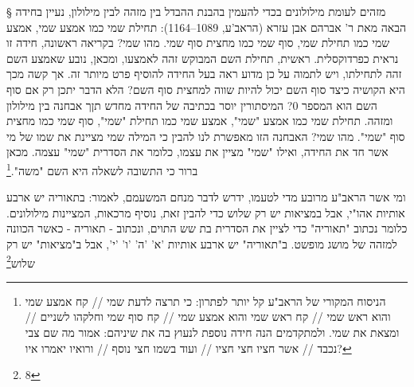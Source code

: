       § מזהים לעומת מילולונים
      בכדי להעמין בהבנת ההבדל בין מזהה לבין מילולון, נעיין בחידה הבאה מאת ר' אברהם
      אבן עזרא (הראב'ע, 1089–1164): תחילת שמי כמו אמצע שמי, אמצע שמי כמו תחילת שמי,
      סוף שמי כמו מחצית סוף שמי. מהו שמי?  בקריאה ראשונה, חידה זו נראית כפרדוקסלית.
      ראשית, תחילת השם המבוקש זהה לאמצעו, ומכאן, נובע שאמצע השם זהה לתחילתו, ויש
      לתמוה על כן מדוע ראה בעל החידה להוסיף פרט מיותר זה. אך קשה מכך היא הקושיה כיצד
      סוף השם יכול להיות שווה למחצית סוף השם? הלא הדבר יתכן רק אם סוף השם הוא המספר
      0?
      המיסתורין יוסר בכתיבה של החידה מחדש תןך אבחנה בין מילולון ומזהה.  תחילת שמי כמו
      אמצע "שמי", אמצע שמי כמו תחילת "שמי", סוף שמי כמו מחצית סוף "שמי". מהו שמי?
      האבחנה הזו מאפשרת לנו להבין כי המילה שמי מציינת את שמו של מי אשר חד את החידה,
      ואילו "שמי" מציין את עצמו, כלומר את הסדרית "שמי" עצמה. מכאן ברור כי התשובה
      לשאלה היא השם "משה".\footnote{הניסוח המקורי של הראב"ע קל יותר לפתרון: כי תרצה לדעת שמי // קח אמצע שמי והוא ראש שמי // קח ראש שמי והוא אמצע שמי // קח סוף שמי וחלקהו לשניים // ומצאת את שמי. ולמתקדמים הנה חידה נוספת לנעוץ בה את שיניהם: אמור מה שם צבי נכבד // אשר חציו חצי חציו // ועוד בשמו חצי נוסף // ורואיו יאמרו איו?}

      ומי אשר הראב"ע מרובע מדי לטעמו, ידרש לדבר מנחם המשעמם, לאמור: בתאוריה יש ארבע
      אותיות אהו"י, אבל במציאות יש רק שלוש
      כדי להבין זאת, נוסיף מרכאות, המציינות מילולונים. כלומר נכתוב "תאוריה" כדי לציין את הסדרית בת שש התוים, ונכתוב - תאוריה - כאשר הכוונה למזהה של מושג מופשט.
      ב"תאוריה" יש ארבע אותיות 'א' 'ה' 'ו' 'י',
      אבל ב"מציאות" יש רק שלוש\footnote{8}

